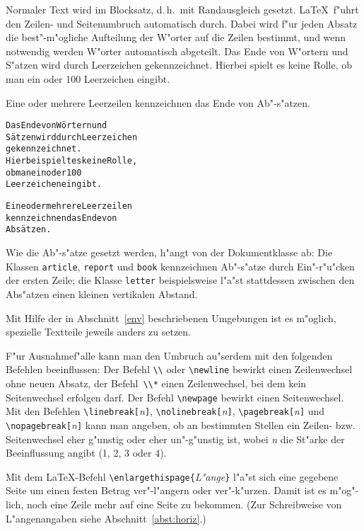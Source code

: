 Normaler Text wird im Blocksatz, d.\,h.~mit Randausgleich
gesetzt.  \LaTeX\ f"uhrt den Zeilen- und Seiten\-umbruch
automatisch durch.  Dabei wird f"ur jeden Absatz die
best"-m"ogliche Aufteilung der W"orter auf die Zeilen bestimmt,
und wenn notwendig werden W"orter automatisch abgeteilt.
\exa
\parindent=17pt\relax
{}\relax %
\noindent Das Ende von W"ortern und S"atzen wird durch Leerzeichen
gekennzeichnet.  Hierbei spielt es keine Rolle, ob man ein oder
100 Leerzeichen eingibt.
\par
Eine oder mehrere Leerzeilen
kennzeichnen das Ende von
Ab"-s"atzen.
\exb
\begin{alltt}
Das Ende von W\"ortern und
S\"atzen wird durch Leerzeichen 
gekennzeichnet.
Hierbei spielt es keine Rolle,
ob man ein  oder           100
Leerzeichen eingibt.
 
Eine oder mehrere Leerzeilen
kennzeichnen das Ende von
Abs\"atzen.
\end{alltt}
\exc
Wie die Ab"-s"atze gesetzt werden, h"angt von der Dokumentklasse ab: 
Die Klassen 
\texttt{article}, \texttt{report} und \texttt{book} kennzeichnen
Ab"-s"atze durch Ein"-r"u"cken der ersten Zeile;
die Klasse \texttt{letter} beispielsweise l"a"st stattdessen 
zwischen den Abs"atzen einen kleinen vertikalen Abstand.

Mit Hilfe der in Abschnitt~\ref{env} beschriebenen Umgebungen ist
es m"oglich, spezielle Textteile jeweils anders zu setzen.
 
F"ur Ausnahmef"alle kann man den Umbruch au"serdem mit den
folgenden Befehlen beeinflussen:
Der Befehl \verb|\\| oder \verb|\newline| bewirkt einen
Zeilenwechsel ohne neuen Absatz, der Befehl~\verb|\\*| einen
Zeilenwechsel, bei dem kein Seitenwechsel erfolgen darf.
Der Befehl \verb|\newpage| bewirkt einen Seitenwechsel.
Mit den Befehlen
\verb|\linebreak[|\textit{n}\verb|]|,
\verb|\nolinebreak[|\textit{n}\verb|]|,
\verb|\pagebreak[|\textit{n}\verb|]|   und
\verb|\nopagebreak[|\textit{n}\verb|]|
kann man angeben, ob an bestimmten Stellen ein Zeilen- bzw.\ %
Seitenwechsel eher g"unstig oder eher un"-g"unstig ist, wobei
\textit{n} die St"arke der Beeinflussung angibt (1, 2, 3 oder 4).

Mit dem \LaTeX-Befehl \verb:\enlargethispage{:\textit{L"ange}\verb:}:
l"a"st sich eine gegebene Seite um einen festen Betrag
ver"-l"angern oder ver"-k"urzen. Damit ist es m"og"-lich, noch
eine Zeile mehr auf eine Seite zu bekommen. 
(Zur Schreibweise von L"angenangaben siehe Abschnitt~\ref{abst:horiz}.)
 

